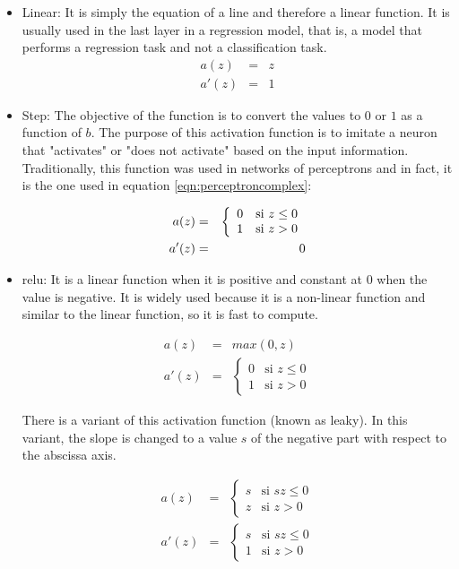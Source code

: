 \begin{itemize}
\item Linear: It is simply the equation of a line and therefore a linear function. It is usually used in the last layer in a regression model, that is, a model that performs a regression task and not a classification task.
\begin{eqnarray}
  a(z) & = & z \\
  a'(z) & = & 1 
\end{eqnarray}

\item Step: The objective of the function is to convert the values to $0$ or $1$ as a function of $b$. The purpose of this activation function is to imitate a neuron that "activates" or "does not activate" based on the input information. Traditionally, this function was used in networks of perceptrons and in fact, it is the one used in equation \ref{eqn:perceptroncomplex}:


\begin{eqnarray}
  a(z) & = & \left\{ \begin{array}{ll}
      0 & \mbox{si } z \leq 0 \\
      1 & \mbox{si } z > 0
      \end{array} \right. \\
     \newline
  a'(z) & = & 0 
\end{eqnarray}


\item \acrlong{relu}: It is a linear function when it is positive and constant at 0 when the value is negative. It is widely used because it is a non-linear function and similar to the linear function, so it is fast to compute.

\begin{eqnarray}
    a(z) & = & max(0,z) \\
  a'(z) & = & \left\{ \begin{array}{ll}
      0 & \mbox{si } z \leq 0   \\
      1 & \mbox{si } z > 0 
      \end{array} \right.
\end{eqnarray}

There is a variant of this activation function (known as leaky). In this variant, the slope is changed to a value $s$ of the negative part with respect to the abscissa axis.

\begin{eqnarray}
    a(z) & = & \left\{ \begin{array}{ll}
      s & \mbox{si } sz \leq 0   \\
      z & \mbox{si } z > 0 
      \end{array} \right. \\
  a'(z) & = & \left\{ \begin{array}{ll}
      s & \mbox{si } sz \leq 0   \\
      1 & \mbox{si } z > 0 
      \end{array} \right.
\end{eqnarray}



\end{itemize}
